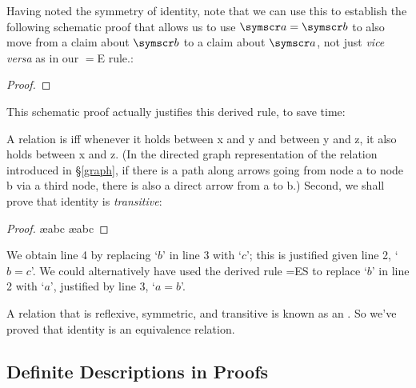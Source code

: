 Having noted the symmetry of identity, note that we can use this to establish the following schematic proof that allows us to use $\meta{a}=\meta{b}$ to also move from a claim about $\meta{b}$ to a claim about $\meta{a}$, not just \emph{vice versa} as in our $=$E rule.:
\begin{proof}
	\idi{}
	 
\end{proof} This schematic proof actually justifies this derived rule, to save time:\label{id.es} 


A relation is   iff whenever it holds between x and y and between y and z, it also holds between x and z. (In the directed graph representation of the relation introduced in §\ref{graph}, if there is a path along arrows going from node a to node b via a third node, there is also a direct arrow from a to b.) Second, we shall prove that identity is \emph{transitive}:
\begin{proof}
	\open
		\ae{abc}
		\ae{abc}
	\close
\end{proof}
We obtain line 4 by replacing `$b$' in line 3 with `$c$'; this is justified given line 2, `$b=c$'. We could alternatively have used the derived rule =ES to replace `$b$' in line 2 with `$a$', justified by line 3, `$a=b$'. 

A relation that is reflexive, symmetric, and transitive is known as an . So we've proved that identity is an equivalence relation. 

\subsection{Definite Descriptions in Proofs}

